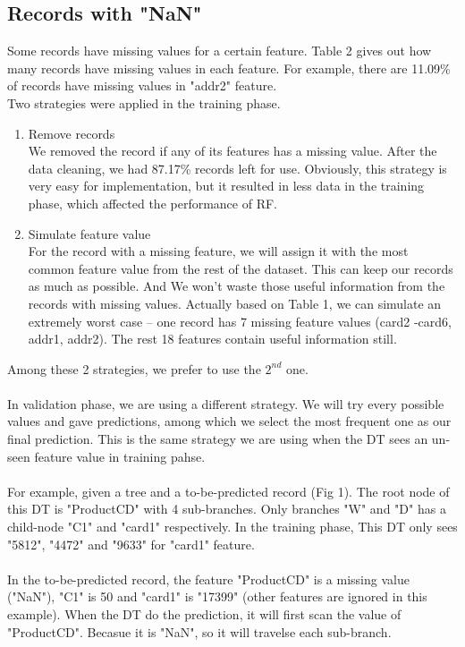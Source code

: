 \documentclass{article}
\begin{document}
\subsection{Records with "NaN"}
Some records have missing values for a certain feature. Table 2 gives out how many records have missing values in each feature. For example, there are 11.09\% of records have missing values in "addr2" feature.\\
Two strategies were applied in the training phase.
\begin{enumerate}
    \item Remove records
    \\We removed the record if any of its features has a missing value. After the data cleaning, we had 87.17\% records left for use. Obviously, this strategy is very easy for implementation, but it resulted in less data in the training phase, which affected the performance of RF.
    \item Simulate feature value
    \\For the record with a missing feature, we will assign it with the most common feature value from the rest of the dataset. This can keep our records as much as possible. And We won't waste those useful information from the records with missing values. Actually based on Table 1, we can simulate an extremely worst case -- one record has 7 missing feature values (card2 -card6, addr1, addr2). The rest 18 features contain useful information still.
\end{enumerate}
Among these 2 strategies, we prefer to use the $2^{nd}$ one.\\\\
In validation phase, we are using a different strategy. We will try every possible values and gave predictions, among which we select the most frequent one as our final prediction. This is the same strategy we are using when the DT sees an un-seen feature value in training pahse.\\\\
For example, given a tree and a to-be-predicted record (Fig 1). The root node of this DT is "ProductCD" with 4 sub-branches. Only branches "W" and "D" has a child-node "C1" and "card1" respectively. In the training phase, This DT only sees "5812", "4472" and "9633" for "card1" feature.\\\\  
In the to-be-predicted record, the feature "ProductCD" is a missing value ("NaN"), "C1" is 50 and "card1" is "17399" (other features are ignored in this example). When the DT do the prediction, it will first scan the value of "ProductCD". Becasue it is "NaN", so it will travelse each sub-branch. 
\end{document}
